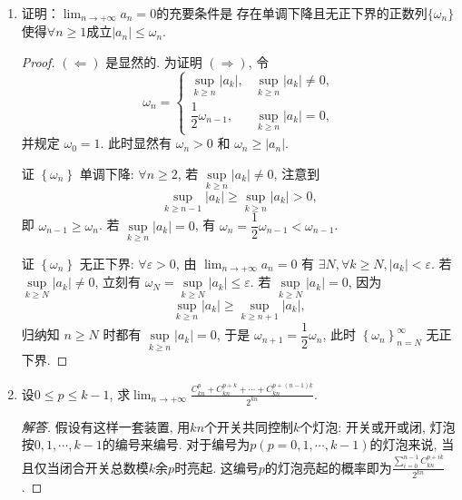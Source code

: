 \begin{1b}
\begin{enumerate}
\item 证明：\(\lim_{n\rightarrow +\infty}a_n=0\)的充要条件是
存在单调下降且无正下界的正数列\(\{\omega_n\}\)使得\(\forall n\geqslant 1\)成立\(\left|a_n\right|\leqslant \omega_n\).

\begin{proof}
\(\left( \Longleftarrow \right)\) 是显然的. 
为证明 \(\left( \Longrightarrow \right)\), 令
\[\omega_n = \begin{cases}
    \sup\limits_{k\geqslant n} {\left| a_k \right|}, 
    & \sup\limits_{k\geqslant n} {\left| a_k \right|} \ne 0, \\[8px]
    \dfrac12 \omega_{n-1}, 
    & \sup\limits_{k\geqslant n} {\left| a_k \right|} = 0,
\end{cases}\]
并规定 \(\omega_0=1\). 
此时显然有 \(\omega_n>0\) 和 \(\omega_n \geqslant \left| a_n \right|\).

证 \(\left\{ \omega_n \right\}\) 单调下降: 
\(\forall n\geqslant2\), 
若 \(\sup\limits_{k\geqslant n} {\left| a_k \right|} \ne 0\), 注意到 
\[\sup\limits_{k\geqslant n-1} {\left| a_k \right|} \geqslant \sup\limits_{k\geqslant n} {\left| a_k \right|} > 0, \]
即 \(\omega_{n-1} \geqslant \omega_{n}\).
若 \(\sup\limits_{k\geqslant n} {\left| a_k \right|} =0\), 
有 \(\omega_n = \dfrac12 \omega_{n-1} < \omega_{n-1}\).

证 \(\left\{ \omega_n \right\}\) 无正下界:
\(\forall \varepsilon>0\), 由 \(\lim_{n\rightarrow +\infty}a_n=0\) 
有 \(\exists N, \forall k\geqslant N, \left| a_k \right|<\varepsilon\). 
若 \(\sup\limits_{k\geqslant N} {\left| a_k \right|} \ne 0\), 
立刻有 \(\omega_N=\sup\limits_{k\geqslant N} {\left| a_k \right|}\leqslant\varepsilon\).
若 \(\sup\limits_{k\geqslant N} {\left| a_k \right|} = 0\), 因为
\[\sup\limits_{k\geqslant n} {\left| a_k \right|} \geqslant \sup\limits_{k\geqslant n+1} {\left| a_k \right|},\] 
归纳知 \(n \geqslant N\) 时都有 \(\sup\limits_{k\geqslant n} {\left| a_k \right|}=0\), 
于是 \(\omega_{n+1}=\dfrac12 \omega_n\), 
此时 \(\left\{ \omega_n \right\}_{n=N}^\infty\) 无正下界.
\end{proof}

\item 设\(0\leqslant p\leqslant k-1\), 求\( \lim_{n\rightarrow +\infty}\frac{C_{kn}^{p}+C_{kn}^{p+k}+\cdots+C_{kn}^{p+(n-1)k}}{2^{kn}}\).
\begin{proof}[解答]
假设有这样一套装置, 用\(kn\)个开关共同控制\(k\)个灯泡: 
开关或开或闭, 灯泡按\(0,1,\cdots,k-1\)的编号来编号. 
对于编号为\(p(p=0,1,\cdots,k-1)\)的灯泡来说, 当且仅当闭合开关总数模\(k\)余\(p\)时亮起. 
这编号\(p\)的灯泡亮起的概率即为\(\frac{\displaystyle\sum_{i=0}^{n-1}C_{kn}^{p+ik}}{2^{kn}}\).


\end{proof}
\end{enumerate}
\end{1b}
